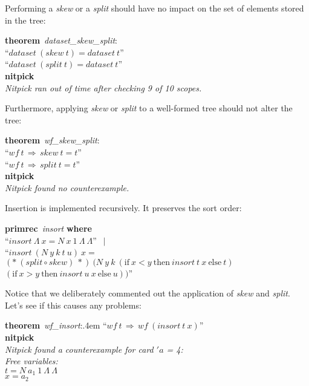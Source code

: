 \documentclass[a4paper,12pt]{article}
\begin{document}
Performing a \textit{skew} or a \textit{split} should have no impact on the set
of elements stored in the tree:

\prew
\textbf{theorem}~\textit{dataset\_skew\_split\/}:\\
``$\textit{dataset}~(\textit{skew}~t) = \textit{dataset}~t$'' \\
``$\textit{dataset}~(\textit{split}~t) = \textit{dataset}~t$'' \\
\textbf{nitpick} \\[2\smallskipamount]
{\slshape Nitpick ran out of time after checking 9 of 10 scopes.}
\postw

Furthermore, applying \textit{skew} or \textit{split} to a well-formed tree
should not alter the tree:

\prew
\textbf{theorem}~\textit{wf\_skew\_split\/}:\\
``$\textit{wf}~t\,\Longrightarrow\, \textit{skew}~t = t$'' \\
``$\textit{wf}~t\,\Longrightarrow\, \textit{split}~t = t$'' \\
\textbf{nitpick} \\[2\smallskipamount]
{\slshape Nitpick found no counterexample.}
\postw

Insertion is implemented recursively. It preserves the sort order:

\prew
\textbf{primrec}~\textit{insort} \textbf{where} \\
``$\textit{insort}~\Lambda~x = N~x~1~\Lambda~\Lambda$'' $\,\mid$ \\
``$\textit{insort}~(N~y~k~t~u)~x =$ \\
\phantom{``}$({*}~(\textit{split} \circ \textit{skew})~{*})~(N~y~k~(\textrm{if}~x < y~\textrm{then}~\textit{insort}~t~x~\textrm{else}~t)$ \\
$(\textrm{if}~x > y~\textrm{then}~\textit{insort}~u~x~\textrm{else}~u))$''
\postw

Notice that we deliberately commented out the application of \textit{skew} and
\textit{split}. Let's see if this causes any problems:

\prew
\textbf{theorem}~\textit{wf\_insort\/}:\kern.4em ``$\textit{wf}~t\,\Longrightarrow\, \textit{wf}~(\textit{insort}~t~x)$'' \\
\textbf{nitpick} \\[2\smallskipamount]
\slshape Nitpick found a counterexample for \textit{card} $'a$ = 4: \\[2\smallskipamount]
\hbox{}\qquad Free variables: \nopagebreak \\
\hbox{}\qquad\qquad $t = N~a_1~1~\Lambda~\Lambda$ \\
\hbox{}\qquad\qquad $x = a_2$
\postw
\end{document}
